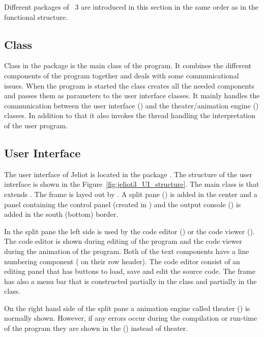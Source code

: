 Different packages of \jel{}~3 are introduced in this section in
the same order as in the functional structure.

\subsection{Class \jel{} }
\label{sec:Jeliot_Class}

Class \jel{} in the package  is the main class of the
program. It combines the different components of the program
together and deals with some communicational issues. When the
program is started the class creates all the needed components and
passes them as parameters to the user interface classes. It mainly
handles the communication between the user interface
() and the theater/animation engine
() classes. In addition to that it also invokes
the thread handling the interpretation of the user program.

\subsection{User Interface}
\label{sec:User_Interface}

The user interface of Jeliot is located in the package
. The structure of the user interface is shown in
the Figure~\ref{fig:jeliot3_UI_structure}. The main class is
 that extends . The frame is layed out
by . A split pane () is added in the
center and a panel containing the control panel (created in
) and the output console () is
added in the south (bottom) border.

In the split pane the left side is used by the code editor
() or the code viewer (). The code
editor is shown during editing of the program and the code viewer
during the animation of the program. Both of the text components
have a line numbering component ( on their row
header). The code editor consist of an editing panel that has
buttons to load, save and edit the source code. The frame has also
a menu bar that is constructed partially in the 
class and partially in the  class.

On the right hand side of the split pane a animation engine called
theater () is normally shown. However, if any errors occur
during the compilation or run-time of the program they are shown
in the  () instead of theater.

